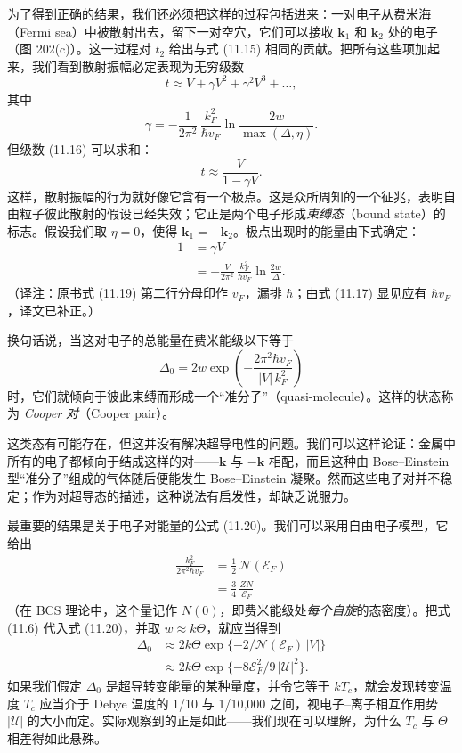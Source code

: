 为了得到正确的结果，我们还必须把这样的过程包括进来：一对电子从费米海（Fermi sea）中被散射出去，留下一对空穴，它们可以接收 $\mathbf{k}_1$ 和 $\mathbf{k}_2$ 处的电子（图 202(c)）。这一过程对 $t_2$ 给出与式 (11.15) 相同的贡献。把所有这些项加起来，我们看到散射振幅必定表现为无穷级数
\begin{equation*}
t\approx V+\gamma V^{2}+\gamma^{2}V^{3}+\ldots,
\tag{11.16}
\end{equation*}
其中
\begin{equation*}
\gamma=-\frac{1}{2\pi^{2}}\,\frac{k_{F}^{2}}{\hbar v_{F}}\ln\frac{2w}{\max{(\Delta,\eta)}}.
\tag{11.17}
\end{equation*}
但级数 (11.16) 可以求和：
\begin{equation*}
t\approx\frac{V}{1-\gamma V}.
\tag{11.18}
\end{equation*}
这样，散射振幅的行为就好像它含有一个极点。这是众所周知的一个征兆，表明自由粒子彼此散射的假设已经失效；它正是两个电子形成\emph{束缚态}（bound state）的标志。假设我们取 $\eta=0$，使得 $\mathbf{k}_1=-\mathbf{k}_2$。极点出现时的能量由下式确定：
\begin{align*}
1&=\gamma V\\
&=-\frac{V}{2\pi^{2}}\,\frac{k_{F}^{2}}{\hbar v_{F}}\ln\frac{2w}{\Delta}.
\tag{11.19}
\end{align*}
（译注：原书式 (11.19) 第二行分母印作 $v_F$，漏排 $\hbar$；由式 (11.17) 显见应有 $\hbar v_F$，译文已补正。）

换句话说，当这对电子的总能量在费米能级以下等于
\begin{equation*}
\Delta_{0}=2w\exp\left(-\frac{2\pi^{2}\hbar v_{F}}{|V|\,k_{F}^{2}}\right)
\tag{11.20}
\end{equation*}
时，它们就倾向于彼此束缚而形成一个“准分子”（quasi-molecule）。这样的状态称为 \emph{Cooper 对}（Cooper pair）。

这类态有可能存在，但这并没有解决超导电性的问题。我们可以这样论证：金属中所有的电子都倾向于结成这样的对——$\mathbf{k}$ 与 $-\mathbf{k}$ 相配，而且这种由 Bose–Einstein 型“准分子”组成的气体随后便能发生 Bose–Einstein 凝聚。然而这些电子对并不稳定；作为对超导态的描述，这种说法有启发性，却缺乏说服力。

最重要的结果是关于电子对能量的公式 (11.20)。我们可以采用自由电子模型，它给出
\begin{align*}
\frac{k_{F}^{2}}{2\pi^{2}\hbar v_{F}} &= \frac{1}{2}\,\mathcal{N}(\mathcal{E}_{F})\\
&= \frac{3}{4}\,\frac{ZN}{\mathcal{E}_{F}}
\tag{11.21}
\end{align*}
（在 BCS 理论中，这个量记作 $N(0)$，即费米能级处\emph{每个自旋}的态密度）。把式 (11.6) 代入式 (11.20)，并取 $w\approx k\Theta$，就应当得到
\begin{align*}
\Delta_{0} &\approx 2k\Theta\exp\{-2/\mathcal{N}(\mathcal{E}_{F})\,|V|\}\\
&\approx 2k\Theta\exp\{-8\mathcal{E}_{F}^{2}/9\,|\mathcal{U}|^{2}\}.
\tag{11.22}
\end{align*}
如果我们假定 $\Delta_{0}$ 是超导转变能量的某种量度，并令它等于 $kT_{c}$，就会发现转变温度 $T_{c}$ 应当介于 Debye 温度的 1/10 与 1/10,000 之间，视电子–离子相互作用势 $|\mathcal{U}|$ 的大小而定。实际观察到的正是如此——我们现在可以理解，为什么 $T_{c}$ 与 $\Theta$ 相差得如此悬殊。

